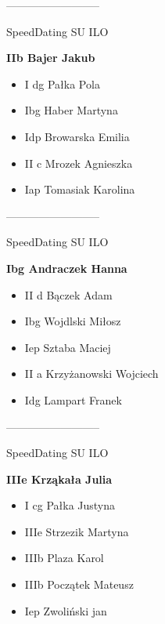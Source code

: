\documentclass[a4paper,10pt]{article}
\begin{document}
\begin{multicols}{3}
\begin{minipage}[l]{\textwidth}
\end{minipage}



\begin{minipage}[l]{\textwidth}
--------------------------

  \footnotesize{SpeedDating SU ILO}

  \bfseries{IIb Bajer Jakub}

  \begin{itemize}
    \item I dg Pałka Pola
    \item Ibg Haber Martyna
    \item Idp Browarska Emilia
    \item II c Mrozek Agnieszka
    \item Iap Tomasiak Karolina

    \end{itemize}



\end{minipage}



\begin{minipage}[l]{\textwidth}
--------------------------

  \footnotesize{SpeedDating SU ILO}

  \bfseries{Ibg Andraczek Hanna}

  \begin{itemize}
    \item II d Bączek Adam
    \item Ibg Wojdlski Miłosz
    \item Iep Sztaba Maciej
    \item II a Krzyżanowski Wojciech
    \item Idg Lampart Franek

    \end{itemize}



\end{minipage}



\begin{minipage}[l]{\textwidth}
--------------------------

  \footnotesize{SpeedDating SU ILO}

  \bfseries{IIIe Krząkała Julia}

  \begin{itemize}
    \item I cg Pałka Justyna
    \item IIIe Strzezik Martyna
    \item IIIb Plaza Karol
    \item IIIb Początek Mateusz
    \item Iep Zwoliński jan


\end{itemize}
\end{minipage}
\end{multicols}
\end{document}
